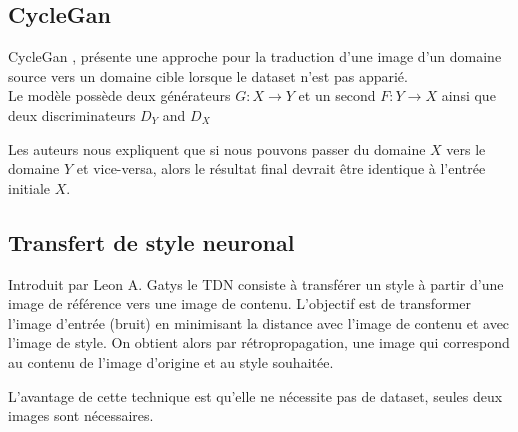 \documentclass[a4paper, 12pt]{report}
\begin{document}
\subsection{CycleGan}
CycleGan \cite{CycleGAN2017}, présente une approche pour la traduction d'une image d'un domaine source vers un domaine cible lorsque le dataset n'est pas apparié. \\

Le modèle possède deux générateurs $G:X\to Y$ et un second $F:Y\to X$ ainsi que deux discriminateurs $D_Y$ and $D_X$

Les auteurs nous expliquent que si nous pouvons passer du domaine $X$ vers le domaine $Y$ et vice-versa, alors le résultat final devrait être identique à l'entrée initiale $X$.

\subsection{Transfert de style neuronal} 
Introduit par Leon A. Gatys \cite{DBLP:journals/corr/GatysEB15a} le TDN consiste à transférer un style à partir d'une image de référence vers une image de contenu. L'objectif est de transformer l'image d'entrée (bruit) en minimisant la distance avec l'image de contenu et avec l'image de style. On obtient alors par rétropropagation, une image qui correspond au contenu de l'image d'origine et au style souhaitée.

L'avantage de cette technique est qu'elle ne nécessite pas de dataset, seules deux images sont nécessaires.
\end{document}
